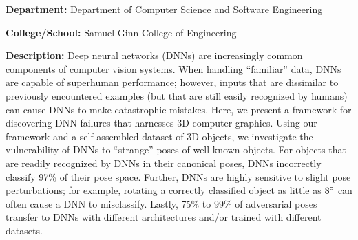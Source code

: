 \documentclass[12pt]{article}
\begin{document}
\textbf{Department:} Department of Computer Science and Software Engineering

\textbf{College/School:} Samuel Ginn College of Engineering

\bigskip

\textbf{Description:} Deep neural networks (DNNs) are increasingly common components of computer vision systems. When handling ``familiar'' data, DNNs are capable of superhuman performance; however, inputs that are dissimilar to previously encountered examples (but that are still easily recognized by humans) can cause DNNs to make catastrophic mistakes. Here, we present a framework for discovering DNN failures that harnesses 3D computer graphics. Using our framework and a self-assembled dataset of 3D objects, we investigate the vulnerability of DNNs to ``strange'' poses of well-known objects. For objects that are readily recognized by DNNs in their canonical poses, DNNs incorrectly classify 97\% of their pose space. Further, DNNs are highly sensitive to slight pose perturbations; for example, rotating a correctly classified object as little as $8\degree$ can often cause a DNN to misclassify. Lastly, 75\% to 99\% of adversarial poses transfer to DNNs with different architectures and/or trained with different datasets.
\end{document}
